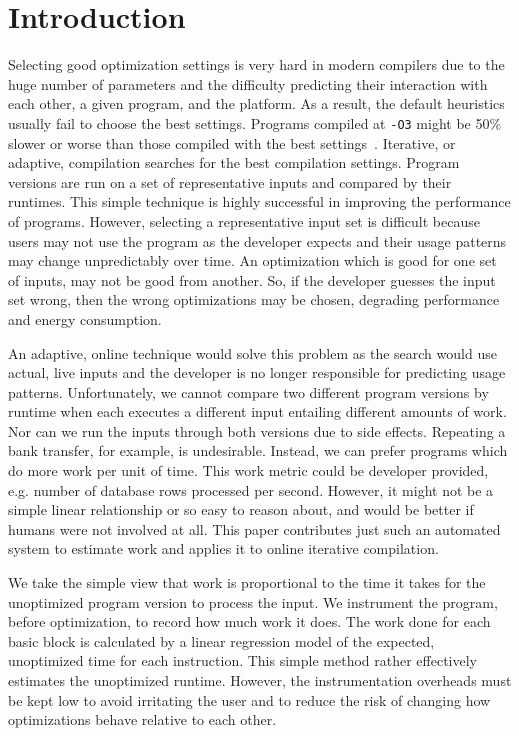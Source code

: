 \section{Introduction}

    Selecting good optimization settings is very hard in modern compilers due to the huge number of parameters and the difficulty
    predicting their interaction with each other, a given program, and the platform. As a result, the default heuristics usually fail to
    choose the best settings. Programs compiled at \texttt{-O3} might be 50\% slower or worse than those compiled with the best
    settings~\cite{??}. Iterative, or adaptive, compilation searches for the best compilation settings. Program versions are run on a set
    of representative inputs and compared by their runtimes. This simple technique is highly successful in improving the performance of
    programs. However, selecting a representative input set is difficult because users may not use the program as the developer expects and
    their usage patterns may change unpredictably over time. An optimization which is good for one set of inputs, may not be good from
    another. So, if the developer guesses the input set wrong, then the wrong optimizations may be chosen, degrading performance and energy
    consumption.

    An adaptive, online technique would solve this problem as the search would use actual, live inputs and the developer is no longer
    responsible for predicting usage patterns. Unfortunately, we cannot compare two different program versions by runtime when each
    executes a different input entailing different amounts of work. Nor can we run the inputs through both versions due to side effects.
    Repeating a bank transfer, for example, is undesirable. Instead, we can prefer programs which do more work per unit of time. This work
    metric could be developer provided, e.g. number of database rows processed per second. However, it might not be a simple linear
    relationship or so easy to reason about, and would be better if humans were not involved at all. This paper contributes just such an
    automated system to estimate work and applies it to online iterative compilation.
    
    We take the simple view that work is proportional to the time it takes for the unoptimized program version to process the input. We
    instrument the program, before optimization, to record how much work it does. The work done for each basic block is calculated by a
    linear regression model of the expected, unoptimized time for each instruction. This simple method rather effectively estimates the
    unoptimized runtime. However, the instrumentation overheads must be kept low to avoid irritating the user and to reduce the risk of
    changing how optimizations behave relative to each other.

